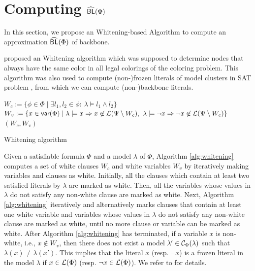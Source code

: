 \section{Computing ${\sf \widehat{BL}}(\Phi)$}
In this section, we propose an Whitening-based Algorithm to compute an approximation ${\sf \widehat{BL}}(\Phi)$ of backbone.

\cite{Par03} proposed an Whitening algorithm which was supposed to determine nodes that always have the same color in all legal colorings of the coloring problem.
This algorithm was also used to compute (non-)frozen literals of model clusters in SAT problem \cite{LMZ09}, from which we can compute (non-)backbone literals.


\begin{algorithm}
\SetAlgoShortEnd
\SetFillComment
{}
$W_c:= \{\phi\in\Phi \mid \exists l_1,l_2\in\phi: \  \lambda\models l_1\wedge l_2\}$\;
$W_v:=\{x\in \textsf{var}(\Phi)\mid \lambda\models x\Rightarrow x\not\in {\cal L}(\Psi\setminus W_c),
        \ \lambda\models \neg x\Rightarrow \neg x\not\in {\cal L}(\Psi\setminus W_c)\}$\;
\Return $(W_c, W_v)$\;
\caption{Whitening algorithm}
\label{alg:whitening}
\end{algorithm}

Given a satisfiable formula $\Phi$ and a model $\lambda$ of $\Phi$,
Algorithm \ref{alg:whitening} computes a set of white clauses $W_c$ and white variables $W_v$ by iteratively making variables and clauses as white.
Initially, all the clauses which contain at least two satisfied literals by $\lambda$ are marked as white.
Then, all the variables whose values in $\lambda$ do not satisfy any non-white clause are marked as white.
Next, Algorithm \ref{alg:whitening} iteratively and alternatively marks clauses that contain at least one white variable and variables whose values in $\lambda$ do not satisfy any non-white clause are marked as white, until no more clause or variable can be marked as white.
After Algorithm \ref{alg:whitening} has terminated, if a variable $x$ is non-white, i.e., $x\not\in W_v$, then there does not exist
a model $\lambda'\in \mathcal{C}_\Phi(\lambda)$ such that $\lambda(x)\neq \lambda(x')$. This implies that the literal $x$ (resp. $\neg x$) is a frozen literal
in the model $\lambda$ if $x\in {\cal L}(\Phi)$ (resp. $\neg x\in {\cal L}(\Phi)$). We refer to \cite{LMZ09} for details.


